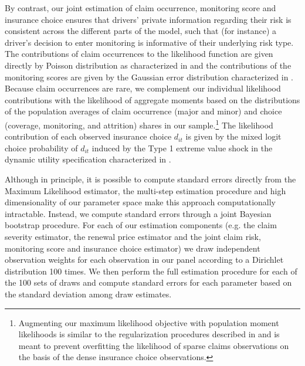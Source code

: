 By contrast, our joint estimation of claim occurrence, monitoring score and insurance choice ensures that drivers' private information regarding their risk is consistent across the different parts of the model, such that (for instance) a driver's decision to enter monitoring is informative of their underlying risk type. The contributions of claim occurrences to the likelihood function are given directly by Poisson distribution as characterized in  and the contributions of the monitoring scores are given by the Gaussian error distribution characterized in . Because claim occurrences are rare, we complement our individual likelihood contributions with the likelihood of aggregate moments based on the distributions of the population averages of claim occurrence (major and minor) and choice (coverage, monitoring, and attrition) shares in our sample.\footnote{Augmenting our maximum likelihood objective with population moment likelihoods is similar to the regularization procedures described in \textcite{chernozhukov2003mcmc, beaulac2023moment} and is meant to prevent overfitting the likelihood of sparse claims observations on the basis of the dense insurance choice observations.} The likelihood contribution of each observed insurance choice $d_{it}$ is given by the mixed logit choice probability of $d_{it}$ induced by the Type 1 extreme value shock in the dynamic utility specification characterized in .

Although in principle, it is possible to compute standard errors directly from the Maximum Likelihood estimator, the multi-step estimation procedure and high dimensionality of our parameter space make this approach computationally intractable. Instead, we compute standard errors through a joint Bayesian bootstrap procedure. For each of our estimation components (e.g. the claim severity estimator, the renewal price estimator and the joint claim risk, monitoring score and insurance choice estimator) we draw independent observation weights for each observation in our panel according to a Dirichlet distribution 100 times. We then perform the full estimation procedure for each of the 100 sets of draws and compute standard errors for each parameter based on the standard deviation among draw estimates.
